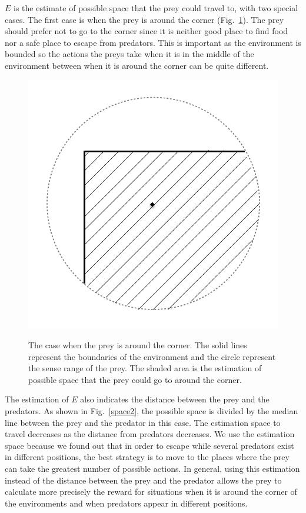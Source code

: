 \documentclass[10pt,conference,letterpaper,doublecolumn]{IEEEtran}
\begin{document}
$E$ is the estimate of possible space that the prey could travel to, with two special cases. The first case is when the prey is around the corner (Fig.~\ref{space1}). The prey should prefer not to go to the corner since it is neither good place to find food nor a safe place to escape from predators. This is important as the environment is bounded so the actions the preys take when it is in the middle of the environment between when it is around the corner can be quite different.
\begin{figure}[H]
  \centering
  \includegraphics[scale=0.4]{space1.png} \\
  \caption{The case when the prey is around the corner. The solid lines represent the boundaries of the environment and the circle represent the sense range of the prey. The shaded area is the estimation of possible space that the prey could go to around the corner.}
  \label{space1}
\end{figure}
The estimation of $E$ also indicates the distance between the prey and the predators. As shown in Fig.~\ref{space2}, the possible space is divided by the median line between the prey and the predator in this case. The estimation space to travel decreases as the distance from predators decreases. We use the estimation space because we found out that in order to escape while several predators exist in different positions, the best strategy is to move to the places where the prey can take the greatest number of possible actions. In general, using this estimation instead of the distance between the prey and the predator allows the prey to calculate more precisely the reward for situations when it is around the corner of the environments and when predators appear in different positions. 
\end{document}
